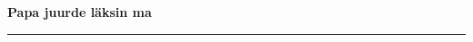 \documentclass[10pt]{book}
\begin{document}
{
  \samepage
  \raggedbottom
  \raggedright
  \sloppy


  \vspace{0.2in}

  \noindent\begin{minipage}{.1\textwidth}
    \hfill\vspace{0.1in}
  \end{minipage}%
  \noindent\begin{minipage}{.8\textwidth}
    \centering
    \bfseries
    \large Papa juurde l\"aksin ma
  \end{minipage}%
  \noindent\begin{minipage}{.1\textwidth}
      \hfill\vspace{0.1in}
  \end{minipage}

  \nopagebreak[4]
  \vspace{0.1in}
  \nopagebreak[4]
  \hrule height 0.05ex
  \nopagebreak[4]
  \vspace{-0.05in}




}
\end{document}
